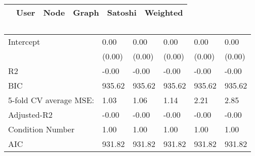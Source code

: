 \begin{table}
\caption{}
\begin{center}
\begin{tabular}{lccccc}
\hline
                       &  User  &  Node  & Graph  & Satoshi & Weighted  \\
\hline
\hline
\end{tabular}
\begin{tabular}{llllll}
Intercept              & 0.00   & 0.00   & 0.00   & 0.00    & 0.00      \\
                       & (0.00) & (0.00) & (0.00) & (0.00)  & (0.00)    \\
R2                     & -0.00  & -0.00  & -0.00  & -0.00   & -0.00     \\
BIC                    & 935.62 & 935.62 & 935.62 & 935.62  & 935.62    \\
5-fold CV average MSE: & 1.03   & 1.06   & 1.14   & 2.21    & 2.85      \\
Adjusted-R2            & -0.00  & -0.00  & -0.00  & -0.00   & -0.00     \\
Condition Number       & 1.00   & 1.00   & 1.00   & 1.00    & 1.00      \\
AIC                    & 931.82 & 931.82 & 931.82 & 931.82  & 931.82    \\
\hline
\end{tabular}
\end{center}
\end{table}